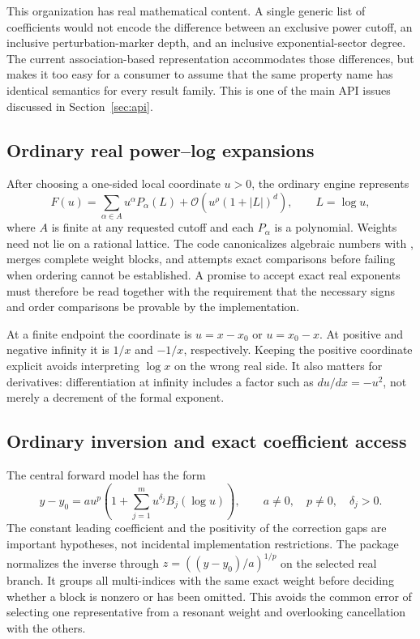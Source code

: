 \documentclass[11pt,letterpaper]{article}
\newcommand{\code}[1]{\texttt{\small\detokenize{#1}}}
\newcommand{\OO}{\mathcal O}
\begin{document}
This organization has real mathematical content. A single generic list of coefficients would not encode the difference between an exclusive power cutoff, an inclusive perturbation-marker depth, and an inclusive exponential-sector degree. The current association-based representation accommodates those differences, but makes it too easy for a consumer to assume that the same property name has identical semantics for every result family. This is one of the main API issues discussed in Section~\ref{sec:api}.

\subsection{Ordinary real power--log expansions}
After choosing a one-sided local coordinate $u>0$, the ordinary engine represents
\begin{equation}
 F(u)=\sum_{\alpha\in A}u^\alpha P_\alpha(L)
       +\OO\!\left(u^\rho(1+|L|)^d\right),
 \qquad L=\log u,
 \label{eq:germ}
\end{equation}
where $A$ is finite at any requested cutoff and each $P_\alpha$ is a polynomial. Weights need not lie on a rational lattice. The code canonicalizes algebraic numbers with \code{RootReduce}, merges complete weight blocks, and attempts exact comparisons before failing when ordering cannot be established. A promise to accept exact real exponents must therefore be read together with the requirement that the necessary signs and order comparisons be provable by the implementation.\cite{repo-core}

At a finite endpoint the coordinate is $u=x-x_0$ or $u=x_0-x$. At positive and negative infinity it is $1/x$ and $-1/x$, respectively. Keeping the positive coordinate explicit avoids interpreting $\log x$ on the wrong real side. It also matters for derivatives: differentiation at infinity includes a factor such as $du/dx=-u^2$, not merely a decrement of the formal exponent.\cite{repo-core,repo-ops}

\subsection{Ordinary inversion and exact coefficient access}
The central forward model has the form
\begin{equation}
 y-y_0=a u^p\left(1+\sum_{j=1}^m u^{\delta_j}B_j(\log u)\right),
 \qquad a\ne0,\quad p\ne0,\quad \delta_j>0.
 \label{eq:model}
\end{equation}
The constant leading coefficient and the positivity of the correction gaps are important hypotheses, not incidental implementation restrictions. The package normalizes the inverse through $z=((y-y_0)/a)^{1/p}$ on the selected real branch. It groups all multi-indices with the same exact weight before deciding whether a block is nonzero or has been omitted. This avoids the common error of selecting one representative from a resonant weight and overlooking cancellation with the others.\cite{repo-core,repo-incremental}
\end{document}
